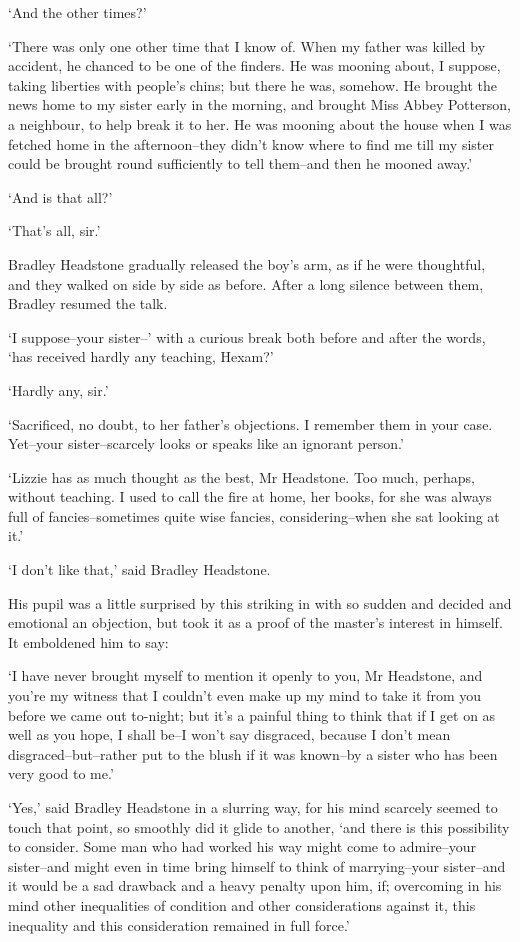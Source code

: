 ‘And the other times?’

‘There was only one other time that I know of. When my father was killed
by accident, he chanced to be one of the finders. He was mooning about,
I suppose, taking liberties with people’s chins; but there he was,
somehow. He brought the news home to my sister early in the morning, and
brought Miss Abbey Potterson, a neighbour, to help break it to her.
He was mooning about the house when I was fetched home in the
afternoon--they didn’t know where to find me till my sister could be
brought round sufficiently to tell them--and then he mooned away.’

‘And is that all?’

‘That’s all, sir.’

Bradley Headstone gradually released the boy’s arm, as if he were
thoughtful, and they walked on side by side as before. After a long
silence between them, Bradley resumed the talk.

‘I suppose--your sister--’ with a curious break both before and after
the words, ‘has received hardly any teaching, Hexam?’

‘Hardly any, sir.’

‘Sacrificed, no doubt, to her father’s objections. I remember them in
your case. Yet--your sister--scarcely looks or speaks like an ignorant
person.’

‘Lizzie has as much thought as the best, Mr Headstone. Too much,
perhaps, without teaching. I used to call the fire at home, her books,
for she was always full of fancies--sometimes quite wise fancies,
considering--when she sat looking at it.’

‘I don’t like that,’ said Bradley Headstone.

His pupil was a little surprised by this striking in with so sudden
and decided and emotional an objection, but took it as a proof of the
master’s interest in himself. It emboldened him to say:

‘I have never brought myself to mention it openly to you, Mr Headstone,
and you’re my witness that I couldn’t even make up my mind to take it
from you before we came out to-night; but it’s a painful thing to think
that if I get on as well as you hope, I shall be--I won’t say disgraced,
because I don’t mean disgraced--but--rather put to the blush if it was
known--by a sister who has been very good to me.’

‘Yes,’ said Bradley Headstone in a slurring way, for his mind scarcely
seemed to touch that point, so smoothly did it glide to another, ‘and
there is this possibility to consider. Some man who had worked his way
might come to admire--your sister--and might even in time bring himself
to think of marrying--your sister--and it would be a sad drawback and a
heavy penalty upon him, if; overcoming in his mind other inequalities of
condition and other considerations against it, this inequality and this
consideration remained in full force.’

